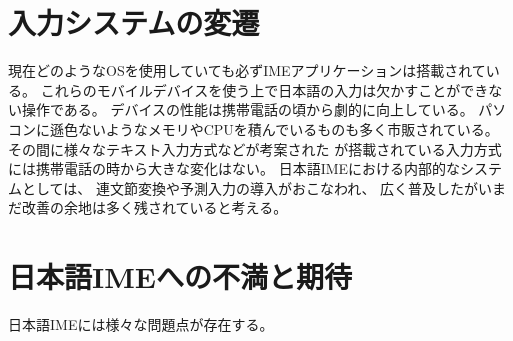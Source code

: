\section{入力システムの変遷}
現在どのようなOSを使用していても必ずIMEアプリケーションは搭載されている。
これらのモバイルデバイスを使う上で日本語の入力は欠かすことができない操作である。
デバイスの性能は携帯電話の頃から劇的に向上している。
パソコンに遜色ないようなメモリやCPUを積んでいるものも多く市販されている。
その間に様々なテキスト入力方式などが考案された\cite{増井俊之:2002-08-01}
が搭載されている入力方式には携帯電話の時から大きな変化はない。
日本語IMEにおける内部的なシステムとしては、
連文節変換や予測入力\cite{pobox}の導入がおこなわれ、
広く普及したがいまだ改善の余地は多く残されていると考える。

\section{日本語IMEへの不満と期待}
日本語IMEには様々な問題点が存在する。

